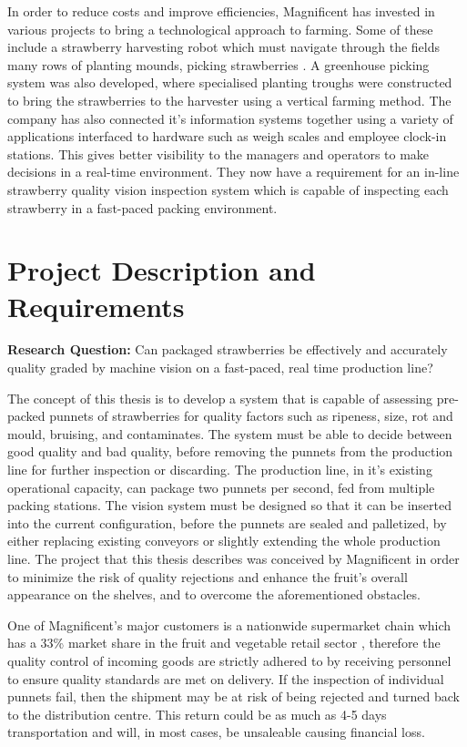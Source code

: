 \documentclass[fleqn,twoside,12pt]{report}
\begin{document}
In order to reduce costs and improve efficiencies, Magnificent has invested in various projects to bring a technological approach to farming. Some of these include a strawberry harvesting robot which must navigate through the fields many rows of planting mounds, picking strawberries \cite{busch}. A greenhouse picking system was also developed, where specialised planting troughs were constructed to bring the strawberries to the harvester using a vertical farming method. The company has also connected it's information systems together using a variety of applications interfaced to hardware such as weigh scales and employee clock-in stations. This gives better visibility to the managers and operators to make decisions in a real-time environment. They now have a requirement for an in-line strawberry quality vision inspection system which is capable of inspecting each strawberry in a fast-paced packing environment.



\section{Project Description and Requirements}
\label{sec:requirements}

\textbf{Research Question:} Can packaged strawberries be effectively and accurately quality graded by machine vision on a fast-paced, real time production line?

The concept of this thesis is to develop a system that is capable of assessing pre-packed punnets of strawberries for quality factors such as ripeness, size, rot and mould, bruising, and contaminates. The system must be able to decide between good quality and bad quality, before removing the punnets from the production line for further inspection or discarding. The production line, in it's existing operational capacity, can package two punnets per second, fed from multiple packing stations. The vision system must be designed so that it can be inserted into the current configuration, before the punnets are sealed and palletized, by either replacing existing conveyors or slightly extending the whole production line. The project that this thesis describes was conceived by Magnificent in order to minimize the risk of quality rejections and enhance the fruit's overall appearance on the shelves, and to overcome the aforementioned obstacles.

One of Magnificent's major customers is a nationwide supermarket chain which has a 33\% market share in the fruit and vegetable retail sector \cite{roymorgan}, therefore the quality control of incoming goods are strictly adhered to by receiving personnel to ensure quality standards are met on delivery. If the inspection of individual punnets fail, then the shipment may be at risk of being rejected and turned back to the distribution centre. This return could be as much as 4-5 days transportation and will, in most cases, be unsaleable causing financial loss.
\end{document}
